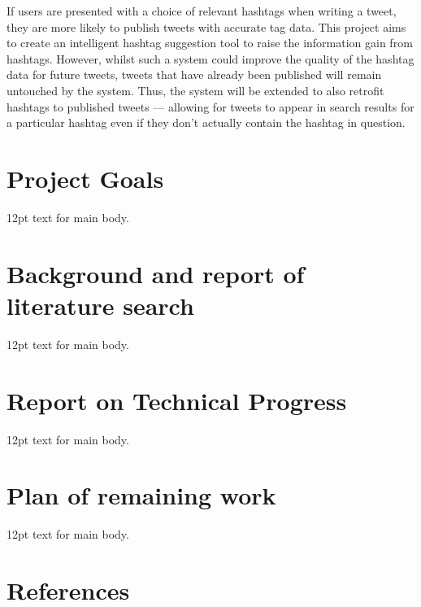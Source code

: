 \documentclass[12pt,a4paper]{article}
\begin{document}
If users are presented with a choice of relevant hashtags when writing a tweet, they are more likely to publish tweets with accurate tag data. This project aims to create an intelligent hashtag suggestion tool to raise the information gain from hashtags. However, whilst such a system could improve the quality of the hashtag data for future tweets, tweets that have already been published will remain untouched by the system. Thus, the system will be extended to also retrofit hashtags to published tweets --- allowing for tweets to appear in search results for a particular hashtag even if they don't actually contain the hashtag in question.
\pagebreak

\tableofcontents
\pagebreak

\setcounter{secnumdepth}{1}
\section{Project Goals}
12pt text for main body.
\pagebreak

\section{Background and report of literature search}
12pt text for main body.
\pagebreak

\section{Report on Technical Progress}
12pt text for main body.
\pagebreak

\section{Plan of remaining work}
12pt text for main body.
\pagebreak

\setcounter{secnumdepth}{0}
\section{References}
\end{document}
